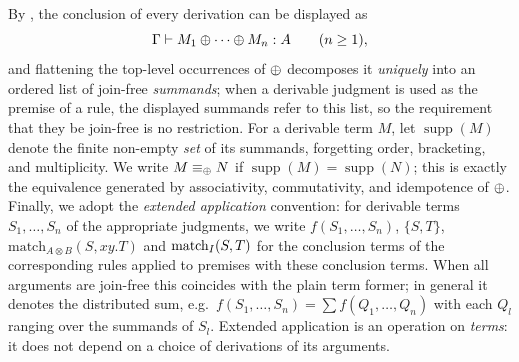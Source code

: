 By , the conclusion of every derivation can be displayed as
\[
\Gamma \vdash M_1 \mathbin{\oplus} \cdots \mathbin{\oplus} M_n : A \qquad (n \geq 1),
\]
and flattening the top-level occurrences of $\mathbin{\oplus}$ decomposes it \emph{uniquely} into an ordered list of join-free \emph{summands}; when a derivable judgment is used as the premise of a rule, the displayed summands refer to this list, so the requirement that they be join-free is no restriction.
For a derivable term $M$, let $\operatorname{supp}(M)$ denote the finite non-empty \emph{set} of its summands, forgetting order, bracketing, and multiplicity.
We write $M \equiv_{\mathbin{\oplus}} N$ if $\operatorname{supp}(M) = \operatorname{supp}(N)$; this is exactly the equivalence generated by associativity, commutativity, and idempotence of $\mathbin{\oplus}$.
Finally, we adopt the \emph{extended application} convention: for derivable terms $S_1, \ldots, S_n$ of the appropriate judgments, we write $f(S_1, \ldots, S_n)$, $\{S, T\}$, $\text{match}_{A \otimes B}(S, xy.T)$ and $\text{match}_{I}(S, T)$ for the conclusion terms of the corresponding rules applied to premises with these conclusion terms.
When all arguments are join-free this coincides with the plain term former; in general it denotes the distributed sum, e.g.\ $f(S_1, \ldots, S_n) = \sum f(Q_1, \ldots, Q_n)$ with each $Q_l$ ranging over the summands of $S_l$.
Extended application is an operation on \emph{terms}: it does not depend on a choice of derivations of its arguments.

